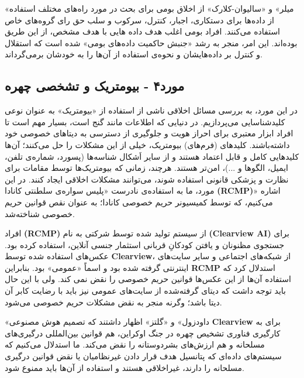 \documentclass[12pt,oneside]{book}
\begin{document}
    «میلر» و «سالیوان-کلارک» از اخلاق بومی برای بحث در مورد راه‌های مختلف استفاده از داده‌ها برای دستکاری، اجبار، کنترل، سرکوب و سلب حق رای گروه‌های خاص استفاده می‌کنند.
    افراد بومی اغلب هدف داده هایی با هدف مشخص، از این طریق بوده‌اند.
    این امر، منجر به رشد «جنبش حاکمیت داده‌های بومی» شده است که استقلال و کنترل بر داده‌هایشان و نحوه‌ی استفاده از آن‌ها را به خودشان برمی‌گرداند.

    \subsection*{مورد۴ - بیومتریک و تشخصی چهره}
    در این مورد، به بررسی مسائل اخلاقی ناشی از استفاده از «بیومتریک» به عنوان نوعی کلیدشناسایی می‌پردازیم.
    در دنیایی که اطلاعات مانند گنج است، بسیار مهم است تا افراد ابزار معتبری برای احراز هویت و جلوگیری از دسترسی به دیتاهای خصوصی خود داشته‌باشند.
    کلید‌های (فرم‌های) بیومتریک، خیلی از این مشکلات را حل می‌کنند؛ آن‌ها کلیدهایی کامل و قابل اعتماد هستند و از سایر اَشکال شناسه‌ها (پسورد، شماره‌ی تلفن، ایمیل، الگوها و ...)، امن‌تر هستند.
    هرچند، زمانی که بیومتریک‌ها توسط مقامات برای نظارت و پزشکی قانونی استفاده شوند، می‌توانند مشکلات اخلاقی ایجاد کنند.
    در این مورد، ما به استفاده‌ی نادرست «پلیس سواره‌ی سلطنتی کانادا \textenglish{\textbf{(RCMP)}}» اشاره می‌کنیم، که توسط کمیسیونر حریم خصوصی کانادا؛ به عنوان نقص قوانین حریم خصوصی شناخته‌شد.

    افراد \textenglish{\textbf{(RCMP)}} از سیستم تولید شده توسط شرکتی به نام \textenglish{\textbf{(Clearview AI)}} برای جستجوی مظنونان و یافتن کودکانِ قربانی استثمار جنسی آنلاین، استفاده کرده بود.
    عکس‌های استفاده شده توسط \textenglish{\textbf{Clearview}}، از شبکه‌های اجتماعی و سایر سایت‌های اینترنتی گرفته شده بود و اسماً «عمومی» بود.
    بنابراین \textenglish{\textbf{RCMP}} استدلال کرد که استفاده آن‌ها از این عکس‌ها قوانین حریم خصوصی را نقض نمی کند.
    ولی با این حال باید توجه داشت که دیتای گرفته‌شده از سایت‌های عمومی نیز باید با رضایت کابر آن دیتا باشد؛ وگرنه منجر به نقض مشکلات حریم خصوصی می‌شود.

    «داودزول» و «گلتز» اظهار داشتند که تصمیم هوش مصنوعی \textenglish{\textbf{Clearview}} برای به کارگیری فناوری تشخیص چهره در جنگ اوکراین، هم قوانین بین‌المللی درگیری‌های مسلحانه و هم ارزش‌های بشردوستانه را نقض می‌کند.
    ما استدلال می‌کنیم که سیستم‌های داده‌ای که پتانسیل هدف قرار دادن غیرنظامیان یا نقض قوانین درگیری مسلحانه را دارند، غیراخلاقی هستند و استفاده از آن‌ها باید ممنوع شود.
\end{document}
